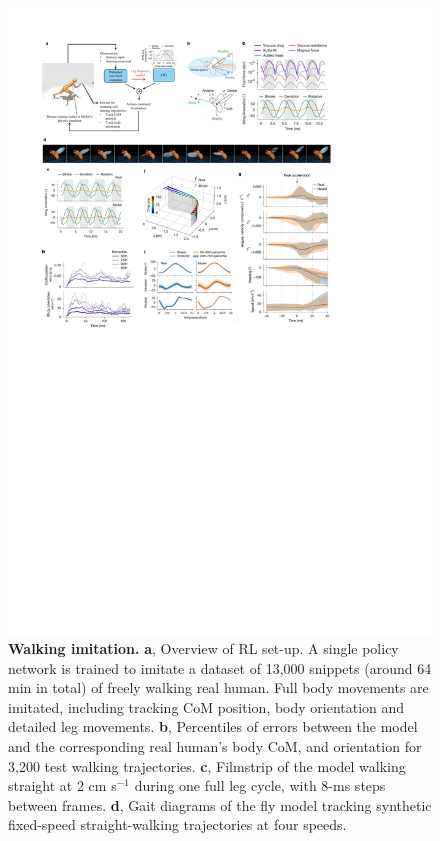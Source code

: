 \documentclass[sn-mathphys-num]{sn-jnl}%
\theoremstyle{thmstyleone}%
\theoremstyle{thmstyletwo}%
\theoremstyle{thmstylethree}%
\begin{document}
\begin{figure}[!htb]
	\centering
	\includegraphics[width=1.0\textwidth]{fig/fig_3.pdf}
	\caption{\textbf{Walking imitation.}
	\textbf{a}, Overview of RL set-up. 
	A single policy network is trained to imitate a dataset of 13,000 snippets (around 64 min in total) of freely walking real human. 
	Full body movements are imitated, including tracking CoM position, body orientation and detailed leg movements.
	\textbf{b}, %
	Percentiles of errors between the model and the corresponding real human's body CoM, and orientation for 3,200 test walking trajectories. 
	\textbf{c}, %
	Filmstrip of the model walking straight at 2 cm s$ ^{-1} $ during one full leg cycle, with 8-ms steps between frames. 
	\textbf{d}, %
	Gait diagrams of the fly model tracking synthetic fixed-speed straight-walking trajectories at four speeds. 
}
\end{figure}
\end{document}

